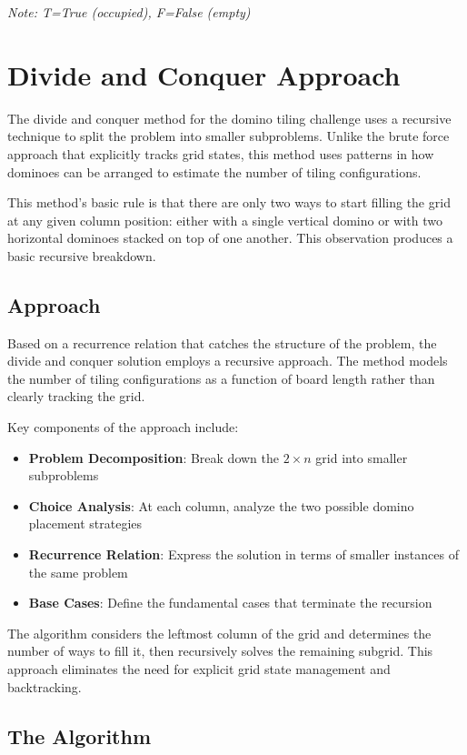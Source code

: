 \documentclass[conference]{IEEEtran}
\begin{document}
\textit{Note: T=True (occupied), F=False (empty)}


\section{Divide and Conquer Approach}

The divide and conquer method for the domino tiling challenge uses a recursive technique to split the problem into smaller subproblems. Unlike the brute force approach that explicitly tracks grid states, this method uses patterns in how dominoes can be arranged to estimate the number of tiling configurations.

This method's basic rule is that there are only two ways to start filling the grid at any given column position: either with a single vertical domino or with two horizontal dominoes stacked on top of one another. This observation produces a basic recursive breakdown.

\subsection{Approach}

Based on a recurrence relation that catches the structure of the problem, the divide and conquer solution employs a recursive approach. The method models the number of tiling configurations as a function of board length rather than clearly tracking the grid.

Key components of the approach include:

\begin{itemize}
    \item \textbf{Problem Decomposition}: Break down the $2 \times n$ grid into smaller subproblems
    \item \textbf{Choice Analysis}: At each column, analyze the two possible domino placement strategies
    \item \textbf{Recurrence Relation}: Express the solution in terms of smaller instances of the same problem
    \item \textbf{Base Cases}: Define the fundamental cases that terminate the recursion
\end{itemize}

The algorithm considers the leftmost column of the grid and determines the number of ways to fill it, then recursively solves the remaining subgrid. This approach eliminates the need for explicit grid state management and backtracking.

\subsection{The Algorithm}
\end{document}
